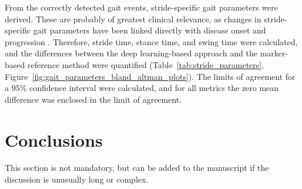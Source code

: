 \documentclass[sensors,article,submit,pdftex,moreauthors]{Definitions/mdpi}
\begin{document}
From the correctly detected gait events, stride-specific gait parameters were derived. These are probably of greatest clinical relevance, as changes in stride-specific gait parameters have been linked directly with disease onset and progression \cite{DelDin2019,Koenig2017,Bertoli2018,SchroederVon1995,Mohan2021,Griskevicius2016,Flachenecker2019}. Therefore, stride time, stance time, and swing time were calculated, and the differences between the deep learning-based approach and the marker-based reference method were quantified (Table~\ref{tab:stride_parameters}, Figure~\ref{fig:gait_parameters_bland_altman_plots}). The limits of agreement for a $95\%$ confidence interval were calculated, and for all metrics the zero mean difference was enclosed in the limit of agreement.

\section{Conclusions}

This section is not mandatory, but can be added to the manuscript if the discussion is unusually long or complex.

\vspace{6pt} 



\end{document}
